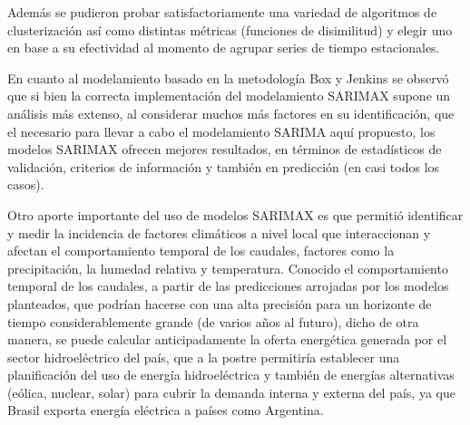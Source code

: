 \documentclass[12pt,oneside]{book}\usepackage[]{graphicx}\usepackage[]{color}
\theoremstyle{definition} %
\begin{document}


Además se pudieron probar satisfactoriamente una variedad de algoritmos de clusterización así como distintas métricas (funciones de disimilitud) y elegir uno en base a su efectividad al momento de agrupar series de tiempo estacionales.




En cuanto al modelamiento basado en la metodología Box y Jenkins se observó que si bien la correcta implementación del modelamiento SARIMAX supone un análisis más extenso, al considerar muchos más factores en su identificación, que el necesario para llevar a cabo el modelamiento SARIMA aquí propuesto, los modelos SARIMAX ofrecen mejores resultados, en términos de estadísticos de validación, criterios de información y también en predicción (en casi todos los casos). 





Otro aporte importante del uso de modelos SARIMAX es que permitió identificar y medir la incidencia de factores climáticos a nivel local que interaccionan y afectan el comportamiento temporal de los caudales, factores como la precipitación, la humedad relativa y temperatura.
Conocido el comportamiento temporal de los caudales, a partir de las predicciones arrojadas por los modelos planteados, que podrían hacerse con una alta precisión para un horizonte de tiempo considerablemente grande (de varios años al futuro), dicho de otra manera, se puede calcular anticipadamente la oferta energética generada por el sector hidroeléctrico del país, que a la postre permitiría establecer una planificación del uso de energía hidroeléctrica  y también de energías alternativas (eólica, nuclear, solar) para cubrir la demanda interna y externa del país, ya que Brasil exporta energía eléctrica a países como Argentina.
\end{document}
